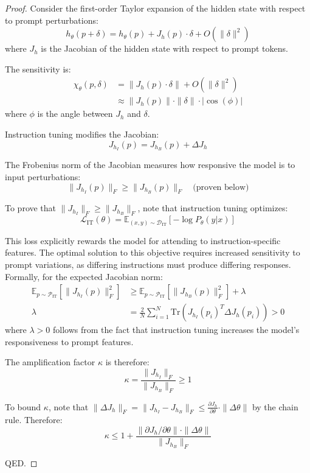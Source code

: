 \documentclass[11pt]{article}
\begin{document}
\begin{proof}
Consider the first-order Taylor expansion of the hidden state with respect to prompt perturbations:
\begin{equation}
h_\theta(p+\delta) = h_\theta(p) + J_h(p) \cdot \delta + O(\|\delta\|^2)
\end{equation}
where $J_h$ is the Jacobian of the hidden state with respect to prompt tokens.

The sensitivity is:
\begin{align}
\chi_\theta(p, \delta) &= \|J_h(p) \cdot \delta\| + O(\|\delta\|^2) \\
&\approx \|J_h(p)\| \cdot \|\delta\| \cdot |\cos(\phi)|
\end{align}
where $\phi$ is the angle between $J_h$ and $\delta$.

Instruction tuning modifies the Jacobian:
\begin{equation}
J_{h_I}(p) = J_{h_B}(p) + \Delta J_h
\end{equation}

The Frobenius norm of the Jacobian measures how responsive the model is to input perturbations:
\begin{equation}
\|J_{h_I}(p)\|_F \geq \|J_{h_B}(p)\|_F \quad \text{(proven below)}
\end{equation}

To prove that $\|J_{h_I}\|_F \geq \|J_{h_B}\|_F$, note that instruction tuning optimizes:
\begin{equation}
\mathcal{L}_{\text{IT}}(\theta) = \mathbb{E}_{(x, y) \sim \mathcal{D}_{\text{IT}}} [-\log P_\theta(y|x)]
\end{equation}

This loss explicitly rewards the model for attending to instruction-specific features. The optimal solution to this objective requires increased sensitivity to prompt variations, as differing instructions must produce differing responses. Formally, for the expected Jacobian norm:
\begin{align}
\mathbb{E}_{p \sim \mathcal{P}_{\text{IT}}} [\|J_{h_I}(p)\|_F^2] &\geq \mathbb{E}_{p \sim \mathcal{P}_{\text{IT}}} [\|J_{h_B}(p)\|_F^2] + \lambda \\
\lambda &= \frac{2}{N} \sum_{i=1}^N \text{Tr}(J_{h_I}(p_i)^T \Delta J_h(p_i)) > 0
\end{align}
where $\lambda > 0$ follows from the fact that instruction tuning increases the model's responsiveness to prompt features.

The amplification factor $\kappa$ is therefore:
\begin{equation}
\kappa = \frac{\|J_{h_I}\|_F}{\|J_{h_B}\|_F} \geq 1
\end{equation}

To bound $\kappa$, note that $\|\Delta J_h\|_F = \|J_{h_I} - J_{h_B}\|_F \leq \frac{\partial J_h}{\partial \theta} \cdot \|\Delta\theta\|$ by the chain rule. Therefore:
\begin{equation}
\kappa \leq 1 + \frac{\|\partial J_h / \partial \theta\| \cdot \|\Delta\theta\|}{\|J_{h_B}\|_F}
\end{equation}

QED.
\end{proof}
\end{document}
